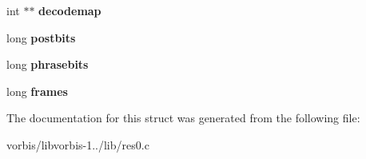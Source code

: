 \begin{DoxyCompactItemize}
\item 
\hypertarget{structvorbis__look__residue0_a34284cd770760f95da4b2d98461682a8}{int $\ast$$\ast$ {\bfseries decodemap}}\label{structvorbis__look__residue0_a34284cd770760f95da4b2d98461682a8}

\item 
\hypertarget{structvorbis__look__residue0_a40604c8d57e4c9d3af79e1d7f44ed6bb}{long {\bfseries postbits}}\label{structvorbis__look__residue0_a40604c8d57e4c9d3af79e1d7f44ed6bb}

\item 
\hypertarget{structvorbis__look__residue0_affb93ccf999a975ea35d198193046980}{long {\bfseries phrasebits}}\label{structvorbis__look__residue0_affb93ccf999a975ea35d198193046980}

\item 
\hypertarget{structvorbis__look__residue0_ae8bde7a200dd22172436657d943713f6}{long {\bfseries frames}}\label{structvorbis__look__residue0_ae8bde7a200dd22172436657d943713f6}

\end{DoxyCompactItemize}


The documentation for this struct was generated from the following file\+:\begin{DoxyCompactItemize}
\item 
vorbis/libvorbis-\/1../lib/res0.\+c\end{DoxyCompactItemize}
